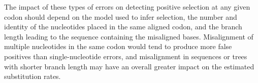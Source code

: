 

The impact of these types of errors on detecting positive selection at
any given codon should depend on the model used to infer selection,
the number and identity of the \nhom nucleotides placed in the same
aligned codon, and the branch length leading to the sequence
containing the misaligned bases. Misalignment of multiple nucleotides
in the same codon would tend to produce more false positives than
single-nucleotide errors, and misalignment in sequences or trees with
shorter branch length may have an overall greater impact on the
estimated \nsyn substitution rates.

